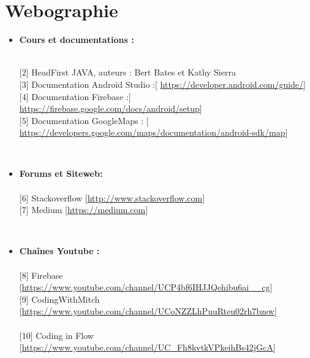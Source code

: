 \chapter*{Webographie}

\vspace{2cm}

\begin{itemize}
\\\item \textbf{\Large{Cours et documentations : }}\\
  [\url{https://openclassrooms.com/fr/courses/626954-creez-votre-application-web-avec-java-ee/}] \vspace{0.3cm}

\\{[2]} HeadFirst JAVA, auteurs : Bert Bates et Kathy Sierra 
\vspace{0.3cm}
\\{[3]} Documentation Android Studio :[ \url{https://developer.android.com/guide/}]
\vspace{0.3cm}
\\{[4]} Documentation Firebase :[ \url{https://firebase.google.com/docs/android/setup}]
\vspace{0.3cm}
\\{[5]} Documentation GoogleMaps : [ \url{https://developers.google.com/maps/documentation/android-sdk/map}]
\vspace{1cm}

\\ \item \textbf{\Large{Forums et Siteweb:}}\\
\\{[6]} Stackoverflow [\url{http://www.stackoverflow.com}]
\vspace{0.3cm}
\\{[7]} Medium [\url{https://medium.com}]

\vspace{1cm}
\\ \item \textbf{\Large{Chaînes Youtube :}}\\
\\{[8]} Firebase 
[\url{https://www.youtube.com/channel/UCP4bf6IHJJQehibu6ai__cg}]
\vspace{0.3cm}
\\{[9]} CodingWithMitch [\url{https://www.youtube.com/channel/UCoNZZLhPuuRteu02rh7bzsw}]\\
\\{[10]} Coding in Flow [\url{https://www.youtube.com/channel/UC_Fh8kvtkVPkeihBs42jGcA}]

\end{itemize}